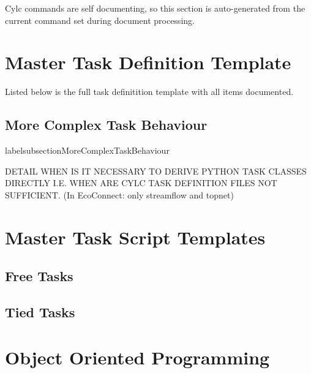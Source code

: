 \documentclass[11pt,a4paper]{article}
\begin{document}
Cylc commands are self documenting, so this section is auto-generated
from the current command set during document processing.

\lstset{language=usage}



\section{Master Task Definition Template}
\label{MasterTaskDefinitionTemplate}

Listed below is the full task definitition template with all items
documented.

\lstset{language=cylctaskdef}



\lstset{language=}

\pagebreak
\subsection{More Complex Task Behaviour}
labelsubsection{MoreComplexTaskBehaviour}

DETAIL WHEN IS IT NECESSARY TO DERIVE PYTHON TASK CLASSES DIRECTLY
I.E. WHEN ARE CYLC TASK DEFINITION FILES NOT SUFFICIENT.
(In EcoConnect: only streamflow and topnet)

\pagebreak
\section{Master Task Script Templates}
\label{MasterTaskScriptTemplates}



\lstset{language=bash}

\pagebreak
\subsection{Free Tasks}


\pagebreak
\subsection{Tied Tasks}


\appendix

\pagebreak
\section{Object Oriented Programming}
\label{ObjectOrientedProgramming}
\end{document}
